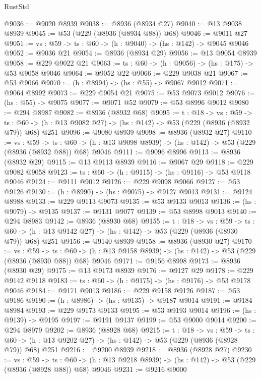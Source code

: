 \begin{lexlean}{RustStd}
\begin{coremodule}
@9036 := @9020 @8939
@9038 := @8936 (@8934 @27)
@9040 := @13 @9038 @8939
@9045 := @53 (@229 (@8936 (@8934 @88)) @68)
@9046 := @9011 @27
@9051 := {vs : @59} -> {ts : @60} -> (h : @9040) -> (hs : @142) -> @9045 @9046
@9052 := @9036 @21
@9054 := @8936 (@8934 @29)
@9056 := @13 @9054 @8939
@9058 := @229 @9022 @21
@9063 := {ts : @60} -> (h : @9056) -> (hs : @175) -> @53 @9058 @9046
@9064 := @9052 @22
@9066 := @229 @9038 @21
@9067 := @53 @9066
@9070 := (h : @8994) -> (hs : @55) -> @9067 @9012
@9071 := @9064 @8992
@9073 := @229 @9054 @21
@9075 := @53 @9073 @9012
@9076 := (hs : @55) -> @9075
@9077 := @9071 @52
@9079 := @53 @8996 @9012
@9080 := @294 @8987
@9082 := @8936 (@8932 @68)
@9095 := {t : @18} ->
  {vs : @59} ->
  {ts : @60} -> (h : @13 @9082 @27) -> (hs : @142) -> @53 (@229 (@8936 (@8932 @79)) @68) @251
@9096 := @9080 @8939
@9098 := @8936 (@8932 @27)
@9110 := {vs : @59} ->
  {ts : @60} -> (h : @13 @9098 @8939) -> (hs : @142) -> @53 (@229 (@8936 (@8932 @88)) @68) @9046
@9111 := @9096 @8996
@9113 := @8936 (@8932 @29)
@9115 := @13 @9113 @8939
@9116 := @9067 @29
@9118 := @229 @9082 @9058
@9123 := {ts : @60} -> (h : @9115) -> (hs : @9116) -> @53 @9118 @9046
@9124 := @9111 @9012
@9126 := @229 @9098 @9066
@9127 := @53 @9126
@9130 := (h : @8990) -> (hs : @9075) -> @9127 @9013
@9131 := @9124 @8988
@9133 := @229 @9113 @9073
@9135 := @53 @9133 @9013
@9136 := (hs : @9079) -> @9135
@9137 := @9131 @9077
@9139 := @53 @8998 @9013
@9140 := @294 @8983
@9142 := @8936 (@8930 @68)
@9155 := {t : @18} ->
  {vs : @59} ->
  {ts : @60} -> (h : @13 @9142 @27) -> (hs : @142) -> @53 (@229 (@8936 (@8930 @79)) @68) @251
@9156 := @9140 @8939
@9158 := @8936 (@8930 @27)
@9170 := {vs : @59} ->
  {ts : @60} -> (h : @13 @9158 @8939) -> (hs : @142) -> @53 (@229 (@8936 (@8930 @88)) @68) @9046
@9171 := @9156 @8998
@9173 := @8936 (@8930 @29)
@9175 := @13 @9173 @8939
@9176 := @9127 @29
@9178 := @229 @9142 @9118
@9183 := {ts : @60} -> (h : @9175) -> (hs : @9176) -> @53 @9178 @9046
@9184 := @9171 @9013
@9186 := @229 @9158 @9126
@9187 := @53 @9186
@9190 := (h : @8986) -> (hs : @9135) -> @9187 @9014
@9191 := @9184 @8984
@9193 := @229 @9173 @9133
@9195 := @53 @9193 @9014
@9196 := (hs : @9139) -> @9195
@9197 := @9191 @9137
@9199 := @53 @9000 @9014
@9200 := @294 @8979
@9202 := @8936 (@8928 @68)
@9215 := {t : @18} ->
  {vs : @59} ->
  {ts : @60} -> (h : @13 @9202 @27) -> (hs : @142) -> @53 (@229 (@8936 (@8928 @79)) @68) @251
@9216 := @9200 @8939
@9218 := @8936 (@8928 @27)
@9230 := {vs : @59} ->
  {ts : @60} -> (h : @13 @9218 @8939) -> (hs : @142) -> @53 (@229 (@8936 (@8928 @88)) @68) @9046
@9231 := @9216 @9000

\end{coremodule}
\end{lexlean}
